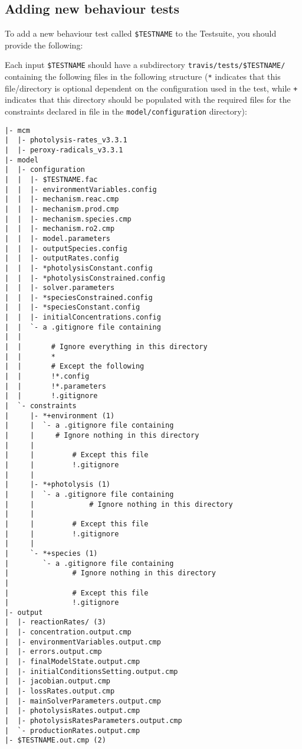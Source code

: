 \subsection{Adding new behaviour tests} \label{subsec:adding-new-behaviour-tests}

To add a new behaviour test called \texttt{\$TESTNAME} to the
Testsuite, you should provide the following:

Each input \texttt{\$TESTNAME} should have a subdirectory
\texttt{travis/tests/\$TESTNAME/} containing the following files in
the following structure (\texttt{*} indicates that this file/directory
is optional dependent on the configuration used in the test, while
\texttt{+} indicates that this directory should be populated with the
required files for the constraints declared in file in the
\texttt{model/configuration} directory):

\begin{verbatim}
|- mcm
|  |- photolysis-rates_v3.3.1
|  |- peroxy-radicals_v3.3.1
|- model
|  |- configuration
|  |  |- $TESTNAME.fac
|  |  |- environmentVariables.config
|  |  |- mechanism.reac.cmp
|  |  |- mechanism.prod.cmp
|  |  |- mechanism.species.cmp
|  |  |- mechanism.ro2.cmp
|  |  |- model.parameters
|  |  |- outputSpecies.config
|  |  |- outputRates.config
|  |  |- *photolysisConstant.config
|  |  |- *photolysisConstrained.config
|  |  |- solver.parameters
|  |  |- *speciesConstrained.config
|  |  |- *speciesConstant.config
|  |  |- initialConcentrations.config
|  |  `- a .gitignore file containing
|  |
|  |       # Ignore everything in this directory
|  |       *
|  |       # Except the following
|  |       !*.config
|  |       !*.parameters
|  |       !.gitignore
|  `- constraints
|     |- *+environment (1)
|     |  `- a .gitignore file containing
|     |     # Ignore nothing in this directory
|     |
|     |         # Except this file
|     |         !.gitignore
|     |
|     |- *+photolysis (1)
|     |  `- a .gitignore file containing
|     |             # Ignore nothing in this directory
|     |
|     |         # Except this file
|     |         !.gitignore
|     |
|     `- *+species (1)
|        `- a .gitignore file containing
|               # Ignore nothing in this directory
|
|               # Except this file
|               !.gitignore
|- output
|  |- reactionRates/ (3)
|  |- concentration.output.cmp
|  |- environmentVariables.output.cmp
|  |- errors.output.cmp
|  |- finalModelState.output.cmp
|  |- initialConditionsSetting.output.cmp
|  |- jacobian.output.cmp
|  |- lossRates.output.cmp
|  |- mainSolverParameters.output.cmp
|  |- photolysisRates.output.cmp
|  |- photolysisRatesParameters.output.cmp
|  `- productionRates.output.cmp
|- $TESTNAME.out.cmp (2)
\end{verbatim}

